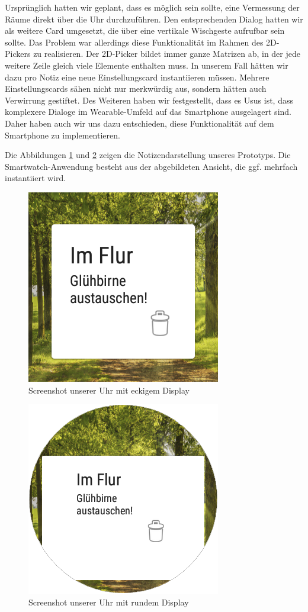 Ursprünglich hatten wir geplant, dass es möglich sein sollte, eine Vermessung der Räume direkt über die Uhr durchzuführen. Den entsprechenden Dialog hatten wir als weitere Card umgesetzt, die über eine vertikale Wischgeste aufrufbar sein sollte. Das Problem war allerdings diese Funktionalität im Rahmen des 2D-Pickers
zu realisieren. Der 2D-Picker bildet immer ganze Matrizen ab, in der jede weitere Zeile gleich viele Elemente enthalten muss. In unserem Fall hätten wir dazu pro Notiz eine neue Einstellungscard instantiieren müssen. Mehrere Einstellungscards sähen nicht nur merkwürdig aus, sondern hätten auch Verwirrung gestiftet. Des Weiteren haben wir festgestellt, dass es Usus ist, dass komplexere Dialoge im Wearable-Umfeld auf das Smartphone ausgelagert sind. Daher haben auch wir uns dazu entschieden, diese Funktionalität auf dem Smartphone zu implementieren.


Die Abbildungen \ref{fig:ScreenshotWatchEckig} und \ref{fig:ScreenshotWatchRund} zeigen
die Notizendarstellung unseres Prototyps. Die Smartwatch-Anwendung besteht aus der abgebildeten Ansicht, die ggf. mehrfach instantiiert wird.

\begin{figure}[H]
\centering
\includegraphics[width=0.3\linewidth]{../Bilder/ScreenshotWatchEckig}
\caption{Screenshot unserer Uhr mit eckigem Display}
\label{fig:ScreenshotWatchEckig}
\end{figure}

\begin{figure}[H]
\centering
\includegraphics[width=0.3\linewidth]{../Bilder/ScreenshotWatchRund}
\caption{Screenshot unserer Uhr mit rundem Display}
\label{fig:ScreenshotWatchRund}
\end{figure}

